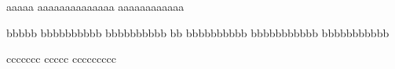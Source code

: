 
aaaaa aaaaaaaaaaaaaa aaaaaaaaaaaa

bbbbb bbbbbbbbbb bbbbbbbbbb bb
bbbbbbbbbb bbbbbbbbbbb bbbbbbbbbbb

ccccccc ccccc ccccccccc
